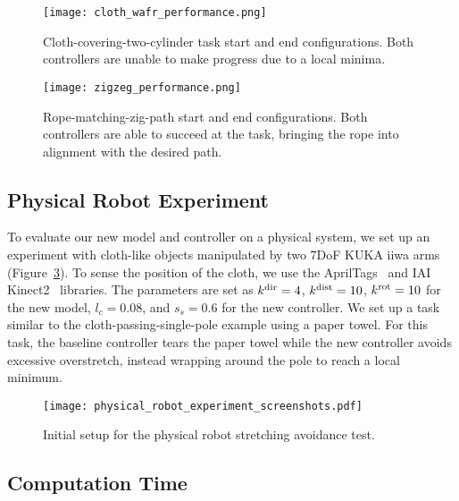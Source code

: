 \begin{figure}[h]
    \centering
    \texttt{[image: cloth\_wafr\_performance.png]}
    \caption{Cloth-covering-two-cylinder task start and end configurations. Both controllers are unable to make progress due to a local minima.}
    \label{fig:cloth_wafr_performance}
\end{figure}
\begin{figure}[h]
    \centering
    \texttt{[image: zigzeg\_performance.png]}
    \caption{Rope-matching-zig-path start and end configurations. Both controllers are able to succeed at the task, bringing the rope into alignment with the desired path.}
    \label{fig:zigzeg_performance}
\end{figure}

\FloatBarrier

\subsection{Physical Robot Experiment}

To evaluate our new model and controller on a physical system, we set up an experiment with cloth-like objects manipulated by two 7DoF KUKA iiwa arms (Figure~\ref{fig:physical_experiment_screenshot_ctl}). To sense the position of the cloth, we use the AprilTags~\cite{olson2011tags} and IAI Kinect2~\cite{iai_kinect2} libraries. The parameters are set as $k^\textrm{dir} = 4$, $k^\textrm{dist} = 10$, $k^{\textrm{rot}} = 10$ for the new model, $l_c = 0.08$, and $s_s = 0.6$ for the new controller. We set up a task similar to the cloth-passing-single-pole example using a paper towel. For this task, the baseline controller tears the paper towel while the new controller avoids excessive overstretch, instead wrapping around the pole to reach a local minimum.

\begin{figure}[h]
    \centering
    \texttt{[image: physical\_robot\_experiment\_screenshots.pdf]}
    \caption{Initial setup for the physical robot stretching avoidance test.}
    \label{fig:physical_experiment_screenshot_ctl}
\end{figure}

\FloatBarrier

\subsection{Computation Time}

